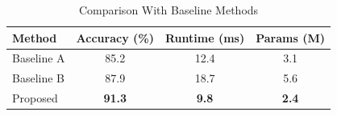\begin{table}[!t]
  \centering
  \caption{Comparison With Baseline Methods}
  \label{tab:example}
  \begin{tabular}{@{}lccc@{}}
    \toprule
    Method        & Accuracy (\%) & Runtime (ms) & Params (M) \\
    \midrule
    Baseline A    & 85.2          & 12.4         & 3.1        \\
    Baseline B    & 87.9          & 18.7         & 5.6        \\
    Proposed      & \textbf{91.3} & \textbf{9.8} & \textbf{2.4} \\
    \bottomrule
  \end{tabular}
\end{table}
